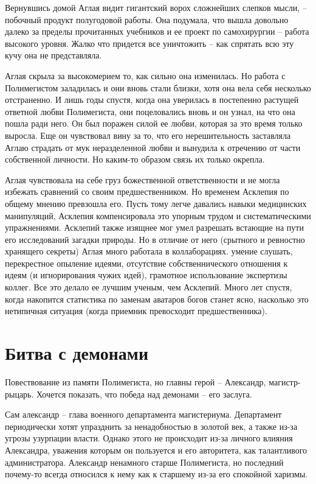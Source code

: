\documentclass[12pt,a4paper]{article}
\begin{document}
Вернувшись домой Аглая видит гигантский ворох сложнейших слепков мысли, -- побочный продукт полугодовой работы. Она подумала, что вышла довольно далеко за пределы прочитанных учебников и ее проект по самохирургии -- работа высокого уровня. Жалко что придется все уничтожить -- как спрятать всю эту кучу она не представляла. 

Аглая скрыла за высокомерием то, как сильно она изменилась. Но работа с Полимегистом заладилась и они вновь стали близки, хотя она вела себя несколько отстраненно. И лишь годы спустя, когда она уверилась в постепенно растущей ответной любви Полимегиста, они поцеловались вновь и он узнал, на что она пошла ради него. Он был поражен силой ее любви, которая за это время только выросла. Еще он чувствовал вину за то, что его нерешительность заставляла Аглаю страдать от мук неразделенной любви и вынудила к отречению от части собственной личности. Но каким-то образом связь их только окрепла.

Аглая чувствовала на себе груз божественной ответственности и не могла избежать сравнений со своим предшественником. Но временем Асклепия по общему мнению превзошла его. Пусть тому легче давались навыки медицинских манипуляций, Асклепия компенсировала это упорным трудом и систематическими упражнениями. Асклепий также изящнее мог умел разрешать встающие на пути его исследований загадки природы. Но в отличие от него (срытного и ревностно хранящего секреты) Аглая много работала в коллаборациях. умение слушать, перекрестное опыление идеями, отсутствие собственнического отношения к идеям (и игнорирования чужих идей), грамотное использование экспертизы коллег. Все это делало ее лучшим ученым, чем Асклепий. Много лет спустя, когда накопится статистика по заменам аватаров богов станет ясно, насколько это нетипичная ситуация (когда приемник превосходит предшественника).

\section*{Битва с демонами}
Повествование из памяти Полимегиста, но главны герой -- Александр, магистр-рыцарь. Хочется показать, что победа над демонами -- его заслуга.

Сам александр -- глава военного департамента магистериума. Департамент периодически хотят упразднить за ненадобностью в золотой век, а также из-за угрозы узурпации власти. Однако этого не происходит из-за личного влияния Александра, уважения которым он пользуется и его авторитета, как талантливого администратора. Александр ненамного старше Полимегиста, но последний почему-то всегда относился к нему как к старшему из-за его спокойной харизмы.
\end{document}

